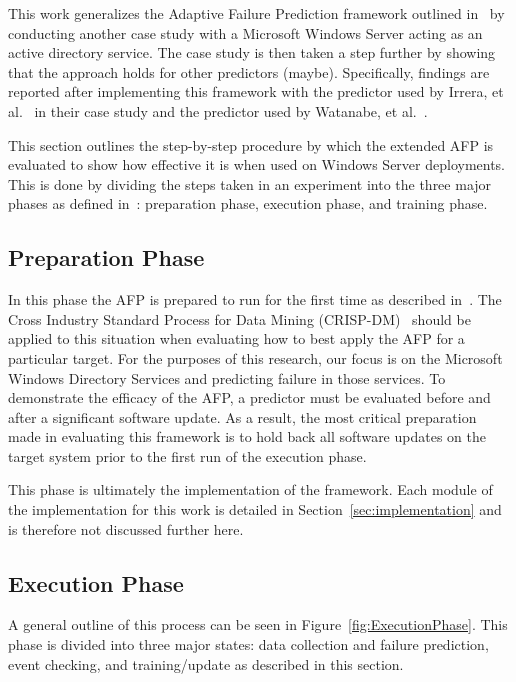 This work generalizes the Adaptive Failure Prediction framework outlined
in~\cite{irrera2015} by conducting another case study with a Microsoft Windows
Server acting as an active directory service.  The case study is then taken a
step further by showing that the approach holds for other predictors (maybe).
Specifically, findings are reported after implementing this framework with
the predictor used by Irrera, et al.~\cite{irrera2015} in their case study and
the predictor used by Watanabe, et al.~\cite{watanabe2014}.

This section outlines the step-by-step procedure by which the extended AFP is
evaluated to show how effective it is when used on Windows Server deployments.
This is done by dividing the steps taken in an experiment into the three major
phases as defined in~\cite{irrera2015}: preparation phase, execution phase, and
training phase.

\subsection{Preparation Phase}
In this phase the AFP is prepared to run for the first time as described
in~\cite{irrera2015}.  The Cross Industry Standard Process for Data Mining
(CRISP-DM)~\cite{crispdm} should be applied to this situation when evaluating
how to best apply the AFP for a particular target.  For the purposes of this
research, our focus is on the Microsoft Windows Directory Services and
predicting failure in those services.  To demonstrate the efficacy of the AFP,
a predictor must be evaluated before and after a significant software update.
As a result, the most critical preparation made in evaluating this framework is
to hold back all software updates on the target system prior to the first run
of the execution phase.  

This phase is ultimately the implementation of the framework.  Each module of
the implementation for this work is detailed in
Section~\ref{sec:implementation} and is therefore not discussed further here.  

\subsection{Execution Phase}
A general outline of this process can be seen in
Figure~\ref{fig:ExecutionPhase}.  This phase is divided into three major
states: data collection and failure prediction, event checking, and
training/update as described in this section.

\figExecutionPhase

